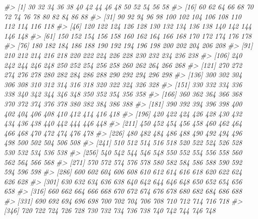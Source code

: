\documentclass[
]{article}
\newenvironment{Shaded}{\begin{snugshade}}{\end{snugshade}}
\newcommand{\CommentTok}[1]{\textcolor[rgb]{0.56,0.35,0.01}{\textit{#1}}}
\begin{document}
\begin{Shaded}
\begin{Highlighting}[]
\CommentTok{\#\textgreater{}   [1]   30   32   34   36   38   40   42   44   46   48   50   52   54   56   58}
\CommentTok{\#\textgreater{}  [16]   60   62   64   66   68   70   72   74   76   78   80   82   84   86   88}
\CommentTok{\#\textgreater{}  [31]   90   92   94   96   98  100  102  104  106  108  110  112  114  116  118}
\CommentTok{\#\textgreater{}  [46]  120  122  124  126  128  130  132  134  136  138  140  142  144  146  148}
\CommentTok{\#\textgreater{}  [61]  150  152  154  156  158  160  162  164  166  168  170  172  174  176  178}
\CommentTok{\#\textgreater{}  [76]  180  182  184  186  188  190  192  194  196  198  200  202  204  206  208}
\CommentTok{\#\textgreater{}  [91]  210  212  214  216  218  220  222  224  226  228  230  232  234  236  238}
\CommentTok{\#\textgreater{} [106]  240  242  244  246  248  250  252  254  256  258  260  262  264  266  268}
\CommentTok{\#\textgreater{} [121]  270  272  274  276  278  280  282  284  286  288  290  292  294  296  298}
\CommentTok{\#\textgreater{} [136]  300  302  304  306  308  310  312  314  316  318  320  322  324  326  328}
\CommentTok{\#\textgreater{} [151]  330  332  334  336  338  340  342  344  346  348  350  352  354  356  358}
\CommentTok{\#\textgreater{} [166]  360  362  364  366  368  370  372  374  376  378  380  382  384  386  388}
\CommentTok{\#\textgreater{} [181]  390  392  394  396  398  400  402  404  406  408  410  412  414  416  418}
\CommentTok{\#\textgreater{} [196]  420  422  424  426  428  430  432  434  436  438  440  442  444  446  448}
\CommentTok{\#\textgreater{} [211]  450  452  454  456  458  460  462  464  466  468  470  472  474  476  478}
\CommentTok{\#\textgreater{} [226]  480  482  484  486  488  490  492  494  496  498  500  502  504  506  508}
\CommentTok{\#\textgreater{} [241]  510  512  514  516  518  520  522  524  526  528  530  532  534  536  538}
\CommentTok{\#\textgreater{} [256]  540  542  544  546  548  550  552  554  556  558  560  562  564  566  568}
\CommentTok{\#\textgreater{} [271]  570  572  574  576  578  580  582  584  586  588  590  592  594  596  598}
\CommentTok{\#\textgreater{} [286]  600  602  604  606  608  610  612  614  616  618  620  622  624  626  628}
\CommentTok{\#\textgreater{} [301]  630  632  634  636  638  640  642  644  646  648  650  652  654  656  658}
\CommentTok{\#\textgreater{} [316]  660  662  664  666  668  670  672  674  676  678  680  682  684  686  688}
\CommentTok{\#\textgreater{} [331]  690  692  694  696  698  700  702  704  706  708  710  712  714  716  718}
\CommentTok{\#\textgreater{} [346]  720  722  724  726  728  730  732  734  736  738  740  742  744  746  748}

\end{Highlighting}
\end{Shaded}
\end{document}
